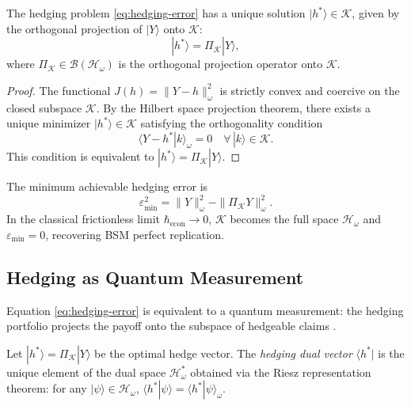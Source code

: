 \begin{theorem}\label{thm:existence-hedge}
The hedging problem \eqref{eq:hedging-error} has a unique solution
$|h^*\rangle \in \mathcal{K}$, given by the orthogonal projection of $|Y\rangle$
onto $\mathcal{K}$:
\begin{equation}\label{eq:optimal-hedge}
    |h^*\rangle = \Pi_{\mathcal{K}} |Y\rangle,
\end{equation}
where $\Pi_{\mathcal{K}} \in \mathcal{B}(\mathcal{H}_\omega)$ is the orthogonal
projection operator onto $\mathcal{K}$.
\end{theorem}

\begin{proof}
The functional $J(h) = \|Y - h\|_\omega^2$ is strictly convex and coercive on the
closed subspace $\mathcal{K}$. By the Hilbert space projection theorem, there exists
a unique minimizer $|h^*\rangle \in \mathcal{K}$ satisfying the orthogonality
condition
\begin{equation*}
    \langle Y - h^* | k \rangle_\omega = 0 \quad \forall \, |k\rangle \in \mathcal{K}.
\end{equation*}
This condition is equivalent to $|h^*\rangle = \Pi_{\mathcal{K}} |Y\rangle$.
\end{proof}

\begin{corollary}\label{cor:min-hedging-error}
The minimum achievable hedging error is
\begin{equation}\label{eq:min-hedging-error}
    \varepsilon_{\min}^2 = \|Y\|_\omega^2 - \|\Pi_{\mathcal{K}} Y\|_\omega^2.
\end{equation}
In the classical frictionless limit $\hbar_{\mathrm{econ}} \to 0$, $\mathcal{K}$
becomes the full space $\mathcal{H}_\omega$ and $\varepsilon_{\min} = 0$, recovering
BSM perfect replication.
\end{corollary}

\subsection{Hedging as Quantum Measurement}

Equation \eqref{eq:hedging-error} is equivalent to a quantum measurement: the
hedging portfolio projects the payoff onto the subspace of hedgeable claims
\citep{vonneumann1932mathematical}.

\begin{definition}\label{def:hedging-dual}
Let $|h^*\rangle = \Pi_{\mathcal{K}} |Y\rangle$ be the optimal hedge vector. The
\emph{hedging dual vector} $\langle h^* |$ is the unique element of the dual space
$\mathcal{H}_\omega^*$ obtained via the Riesz representation theorem: for any
$|\psi\rangle \in \mathcal{H}_\omega$,
$\langle h^* | \psi \rangle = \langle h^* | \psi \rangle_\omega$.
\end{definition}

